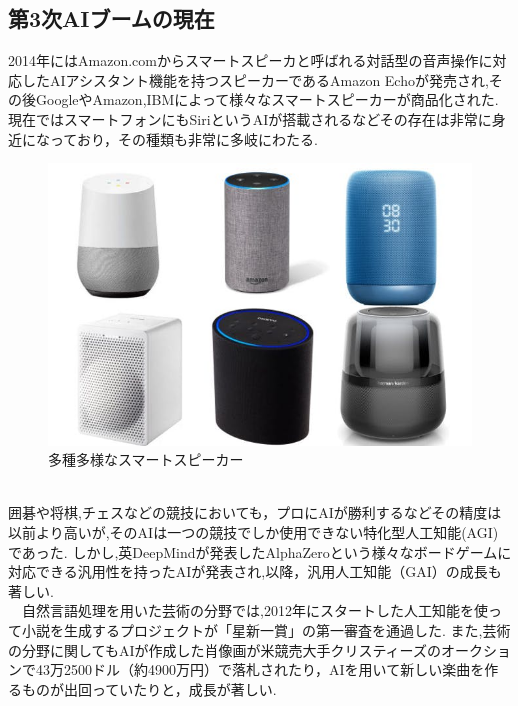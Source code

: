 \subsection{第3次AIブームの現在}
2014年にはAmazon.comからスマートスピーカと呼ばれる対話型の音声操作に対応したAIアシスタント機能を持つスピーカーであるAmazon Echoが発売され,その後GoogleやAmazon,IBMによって様々なスマートスピーカーが商品化された.
現在ではスマートフォンにもSiriというAIが搭載されるなどその存在は非常に身近になっており，その種類も非常に多岐にわたる.
\begin{figure}[!ht]
    \begin{screen}
    \begin{center}
        \includegraphics[scale=0.6, clip]{./img/smartspeaker_list.jpg}
        \caption{多種多様なスマートスピーカー}
        \label{fig:多種多様なスマートスピーカー}
    \end{center}
\end{screen}
\end{figure}\\
囲碁や将棋,チェスなどの競技においても，プロにAIが勝利するなどその精度は以前より高いが,そのAIは一つの競技でしか使用できない特化型人工知能(AGI)であった.
しかし,英DeepMindが発表したAlphaZeroという様々なボードゲームに対応できる汎用性を持ったAIが発表され,以降，汎用人工知能（GAI）の成長も著しい.\\
　自然言語処理を用いた芸術の分野では,2012年にスタートした人工知能を使って小説を生成するプロジェクトが「星新一賞」の第一審査を通過した.\cite{webpage2}
また,芸術の分野に関してもAIが作成した肖像画が米競売大手クリスティーズのオークションで43万2500ドル（約4900万円）で落札されたり，AIを用いて新しい楽曲を作るものが出回っていたりと，成長が著しい.\cite{webpage3}\\
